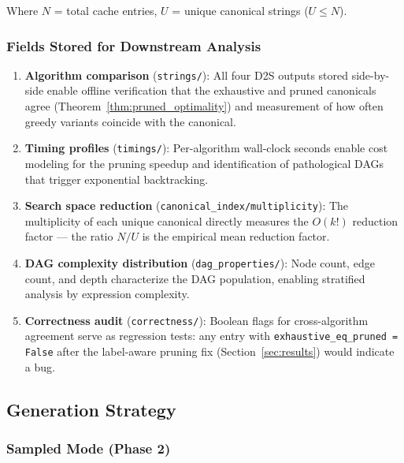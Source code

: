 Where $N$ = total cache entries, $U$ = unique canonical strings ($U \leq N$).

\subsubsection{Fields Stored for Downstream Analysis}

\begin{enumerate}[nosep]
  \item \textbf{Algorithm comparison} (\texttt{strings/}): All four D2S outputs
    stored side-by-side enable offline verification that the exhaustive and pruned
    canonicals agree (Theorem~\ref{thm:pruned_optimality}) and measurement of
    how often greedy variants coincide with the canonical.

  \item \textbf{Timing profiles} (\texttt{timings/}): Per-algorithm wall-clock
    seconds enable cost modeling for the pruning speedup and identification of
    pathological DAGs that trigger exponential backtracking.

  \item \textbf{Search space reduction} (\texttt{canonical\_index/multiplicity}):
    The multiplicity of each unique canonical directly measures the $O(k!)$
    reduction factor --- the ratio $N/U$ is the empirical mean reduction factor.

  \item \textbf{DAG complexity distribution} (\texttt{dag\_properties/}):
    Node count, edge count, and depth characterize the DAG population, enabling
    stratified analysis by expression complexity.

  \item \textbf{Correctness audit} (\texttt{correctness/}): Boolean flags for
    cross-algorithm agreement serve as regression tests: any entry with
    \texttt{exhaustive\_eq\_pruned = False} after the label-aware pruning fix
    (Section~\ref{sec:results}) would indicate a bug.
\end{enumerate}

\subsection{Generation Strategy}

\subsubsection{Sampled Mode (Phase 2)}

